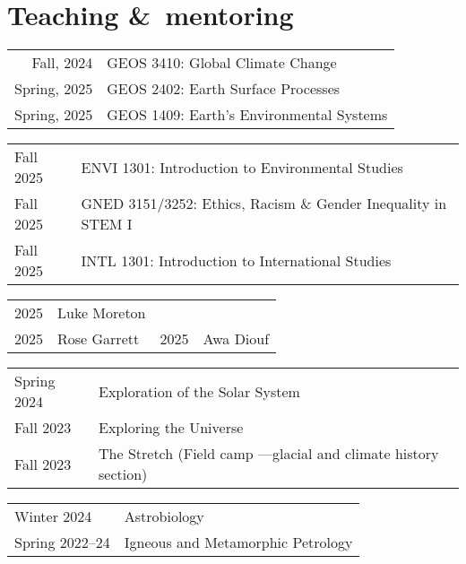 \section{Teaching \&\ mentoring}
\begin{tabular}{r l} %
	Fall, 2024\ongoing & GEOS 3410: Global Climate Change\\
	Spring, 2025\ongoing & GEOS 2402: Earth Surface Processes\\
	Spring, 2025\ongoing & GEOS 1409: Earth's Environmental Systems\\
\end{tabular}

\begin{tabular}{l l} %
	Fall 2025 & ENVI 1301: Introduction to Environmental Studies \\
	Fall 2025 & GNED 3151/3252: Ethics, Racism \& Gender Inequality in STEM I\\
	Fall 2025 & INTL 1301: Introduction to International Studies
\end{tabular}

\begin{tabular}{ll|ll}
	2025\ongoing & Luke Moreton
	\\
	2025\ongoing & Rose Garrett
	&
	2025\ongoing & Awa Diouf
\end{tabular}

\begin{tabular}{l l}
	Spring 2024 & Exploration of the Solar System \\
	Fall 2023 & Exploring the Universe \\
	Fall 2023 & The Stretch \normalfont (Field camp ---glacial and climate history section)
\end{tabular}

\begin{tabular}{p{.15\linewidth} l} %
	Winter 2024 & Astrobiology\\
	Spring 2022--24 & Igneous and Metamorphic Petrology
\end{tabular}

